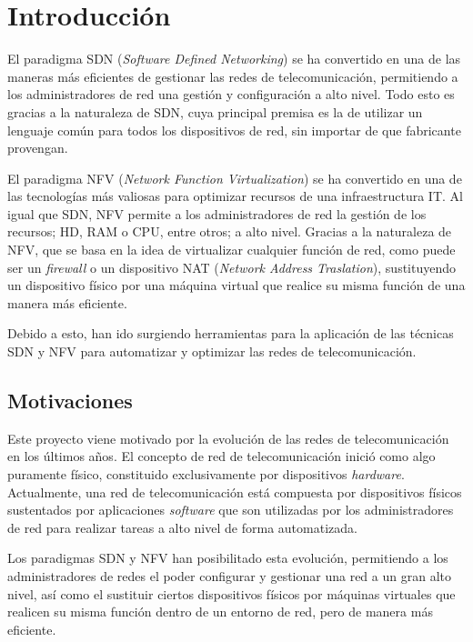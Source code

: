 \chapter{Introducción}

El paradigma SDN (\textit{Software Defined Networking}) se ha convertido en una de las maneras más eficientes de gestionar las redes de telecomunicación, permitiendo a los administradores de red una gestión y configuración a alto nivel. Todo esto es gracias a la naturaleza de SDN, cuya principal premisa es la de utilizar un lenguaje común para todos los dispositivos de red, sin importar de que fabricante provengan.

El paradigma NFV (\textit{Network Function Virtualization}) se ha convertido en una de las tecnologías más valiosas para optimizar recursos de una infraestructura IT. Al igual que SDN, NFV permite a los administradores de red la gestión de los recursos; HD, RAM o CPU, entre otros; a alto nivel. Gracias a la naturaleza de NFV, que se basa en la idea de virtualizar cualquier función de red, como puede ser un \textit{firewall} o un dispositivo NAT (\textit{Network Address Traslation}), sustituyendo un dispositivo físico por una máquina virtual que realice su misma función de una manera más eficiente.

Debido a esto, han ido surgiendo herramientas para la aplicación de las técnicas SDN y NFV para automatizar y optimizar las redes de telecomunicación.

\section{Motivaciones}

Este proyecto viene motivado por la evolución de las redes de telecomunicación en los últimos años. El concepto de red de telecomunicación inició como algo puramente físico, constituido exclusivamente por dispositivos \textit{hardware}. Actualmente, una red de telecomunicación está compuesta por dispositivos físicos sustentados por aplicaciones \textit{software} que son utilizadas por los administradores de red para realizar tareas a alto nivel de forma automatizada.

Los paradigmas SDN y NFV han posibilitado esta evolución, permitiendo a los administradores de redes el poder configurar y gestionar una red a un gran alto nivel, así como el sustituir ciertos dispositivos físicos por máquinas virtuales que realicen su misma función dentro de un entorno de red, pero de manera más eficiente.

